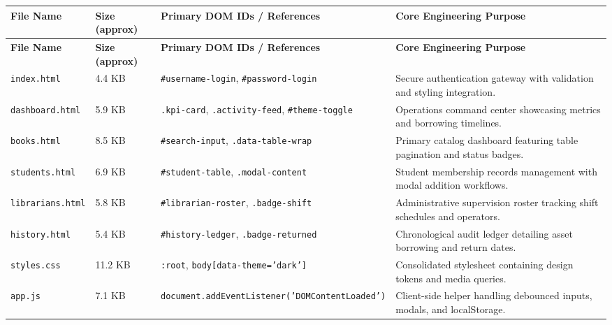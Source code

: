 \documentclass[11pt,a4paper]{report}
\begin{document}
\vspace{10pt}
\noindent
\begin{center}
\renewcommand{\arraystretch}{1.25}
\begin{longtable}{|L{2.6cm}|L{2.0cm}|L{5.0cm}|L{5.5cm}|}
\hline
{}
\textbf{\color{white}File Name} & \textbf{\color{white}Size (approx)} & \textbf{\color{white}Primary DOM IDs / References} & \textbf{\color{white}Core Engineering Purpose} \\
\hline
\endfirsthead
\hline
{}
\textbf{\color{white}File Name} & \textbf{\color{white}Size (approx)} & \textbf{\color{white}Primary DOM IDs / References} & \textbf{\color{white}Core Engineering Purpose} \\
\hline
\endhead
\texttt{index.html} & 4.4 KB & \texttt{\#username-login}, \texttt{\#password-login} & Secure authentication gateway with validation and styling integration. \\
\hline
{}
\texttt{dashboard.html} & 5.9 KB & \texttt{.kpi-card}, \texttt{.activity-feed}, \texttt{\#theme-toggle} & Operations command center showcasing metrics and borrowing timelines. \\
\hline
\texttt{books.html} & 8.5 KB & \texttt{\#search-input}, \texttt{.data-table-wrap} & Primary catalog dashboard featuring table pagination and status badges. \\
\hline
{}
\texttt{students.html} & 6.9 KB & \texttt{\#student-table}, \texttt{.modal-content} & Student membership records management with modal addition workflows. \\
\hline
\texttt{librarians.html} & 5.8 KB & \texttt{\#librarian-roster}, \texttt{.badge-shift} & Administrative supervision roster tracking shift schedules and operators. \\
\hline
{}
\texttt{history.html} & 5.4 KB & \texttt{\#history-ledger}, \texttt{.badge-returned} & Chronological audit ledger detailing asset borrowing and return dates. \\
\hline
\texttt{styles.css} & 11.2 KB & \texttt{:root}, \texttt{body[data-theme='dark']} & Consolidated stylesheet containing design tokens and media queries. \\
\hline
{}
\texttt{app.js} & 7.1 KB & \texttt{document.addEventListener('DOMContentLoaded')} & Client-side helper handling debounced inputs, modals, and localStorage. \\
\hline
\end{longtable}
\end{center}
\end{document}
